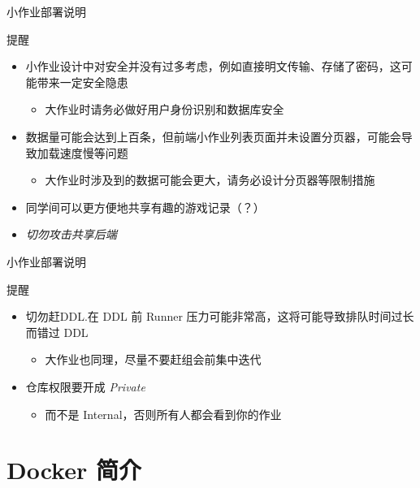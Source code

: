 \documentclass{beamer}
\begin{document}
\begin{frame}{小作业部署说明}
    \begin{block}{提醒}
        \begin{itemize}
            \item 小作业设计中对安全并没有过多考虑，例如直接明文传输、存储了密码，这可能带来一定安全隐患
            \begin{itemize}
                \item 大作业时请务必做好用户身份识别和数据库安全
            \end{itemize}
            \item 数据量可能会达到上百条，但前端小作业列表页面并未设置分页器，可能会导致加载速度慢等问题
            \begin{itemize}
                \item 大作业时涉及到的数据可能会更大，请务必设计分页器等限制措施
            \end{itemize}
            \item  同学间可以更方便地共享有趣的游戏记录（？）
            \item \emph{切勿攻击共享后端}
        \end{itemize}
    \end{block}
\end{frame}

\begin{frame}{小作业部署说明}
    \begin{block}{提醒}
        \begin{itemize}
            \item 切勿赶DDL.在 DDL 前 Runner 压力可能非常高，这将可能导致排队时间过长而错过 DDL
            \begin{itemize}
                \item 大作业也同理，尽量不要赶组会前集中迭代
            \end{itemize}
            \item 仓库权限要开成 \emph{Private}
            \begin{itemize}
                \item 而不是 Internal，否则所有人都会看到你的作业
            \end{itemize}
        \end{itemize}
    \end{block}
\end{frame}

\section{Docker 简介}
\end{document}
